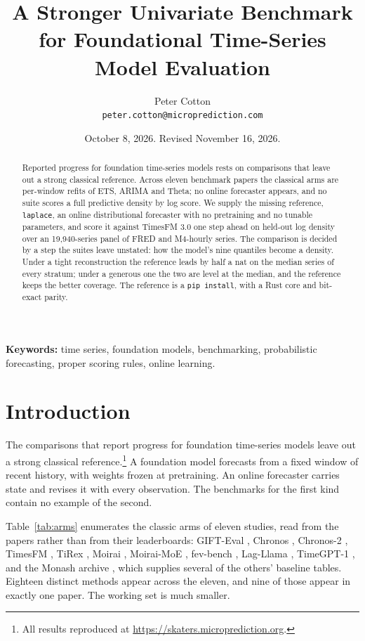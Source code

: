 \documentclass[article]{jss}
\author{
  Peter Cotton\\
  \texttt{peter.cotton@microprediction.com}
}
\title{A Stronger Univariate Benchmark for Foundational Time-Series Model Evaluation}
\date{October 8, 2026. Revised November 16, 2026.}
\providecommand{\proglang}[1]{\textsf{#1}}
\providecommand{\code}[1]{\texttt{#1}}
\newcommand{\paperabstract}{
Reported progress for foundation time-series models rests on comparisons that
leave out a strong classical reference. Across eleven benchmark papers the
classical arms are per-window refits of ETS, ARIMA and Theta; no online
forecaster appears, and no suite scores a full predictive density by log score. We supply the
missing reference, \code{laplace}, an online distributional forecaster with no
pretraining and no tunable parameters, and score it against TimesFM 3.0 one
step ahead on held-out log density over an 19{,}940-series panel of
\proglang{FRED} and M4-hourly series. The comparison is decided by a step the
suites leave unstated: how the model's nine quantiles become a density. Under
a tight reconstruction the reference leads by half a nat on the median series
of every stratum; under a generous one the two are level at the median, and
the reference keeps the better coverage. The reference is a \code{pip install},
with a \proglang{Rust} core and bit-exact parity.
}
\begin{document}
\maketitle

\begin{abstract}
\paperabstract
\end{abstract}

\noindent\textbf{Keywords:} time series, foundation models, benchmarking,
probabilistic forecasting, proper scoring rules, online learning.

\section{Introduction}\label{sec:intro}

The comparisons that report progress for foundation time-series models leave
out a strong classical reference.\footnote{All results reproduced at
\url{https://skaters.microprediction.org}.} A foundation model forecasts from a fixed
window of recent history, with weights frozen at pretraining. An online
forecaster carries state and revises it with every observation. The benchmarks
for the first kind contain no example of the second.

Table~\ref{tab:arms} enumerates the classic arms of eleven studies, read from
the papers rather than from their leaderboards: GIFT-Eval
\citep{aksu2024gifteval}, Chronos \citep{ansari2024chronos}, Chronos-2
\citep{ansari2025chronos2}, TimesFM \citep{das2024timesfm}, TiRex
\citep{auer2025tirex}, Moirai \citep{woo2024moirai}, Moirai-MoE
\citep{liu2024moiraimoe}, fev-bench \citep{shchur2025fevbench}, Lag-Llama
\citep{rasul2023lagllama}, TimeGPT-1 \citep{garza2023timegpt}, and the Monash
archive \citep{godahewa2021monash}, which supplies several of the others'
baseline tables. Eighteen distinct methods appear across the eleven, and nine of
those appear in exactly one paper. The working set is much smaller.
\end{document}
